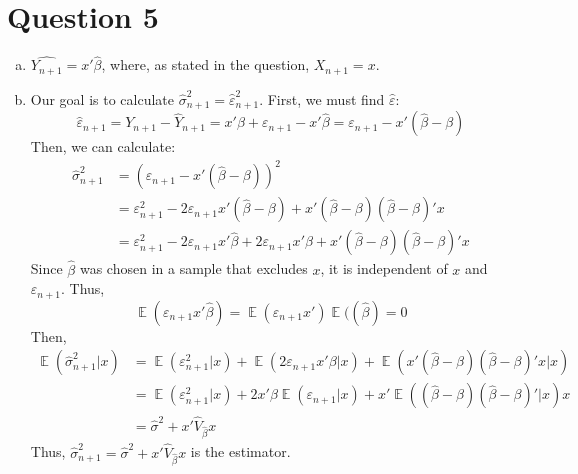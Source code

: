\documentclass{article}
\newcommand{\bhat}{\hat{\beta}}
\newcommand{\vhat}{\hat{\varepsilon}}
\DeclareMathOperator{\E}{\mathbb{E}}%
\begin{document}
\section*{Question 5}
\begin{enumerate}[(a)]
			\item ${\hat{Y_{n+1}}=x'\bhat}$, where, as stated in the question, ${X_{n+1}=x}$.
			
			\item Our goal is to calculate ${\hat{\sigma}^2_{n+1}=\vhat_{n+1}^2}$. First, we must find $\vhat$:
				\[
					\vhat_{n+1}=Y_{n+1} - \hat{Y}_{n+1} = x'\beta + \varepsilon_{n+1} - x'\bhat = \varepsilon_{n+1} - x'(\bhat-\beta)
				\]
				Then, we can calculate:
				\begin{align*}
					\hat{\sigma}^2_{n+1} 	&= \left(\varepsilon_{n+1} - x'(\bhat-\beta)\right)^2	\\
											&= \varepsilon_{n+1}^2 - 2\varepsilon_{n+1}x'(\bhat-\beta) + x'(\bhat-\beta)(\bhat-\beta)'x	\\
											&= \varepsilon_{n+1}^2 - 2\varepsilon_{n+1}x'\bhat + 2\varepsilon_{n+1}x'\beta + x'(\bhat-\beta)(\bhat-\beta)'x
				\end{align*}
				Since $\bhat$ was chosen in a sample that excludes $x$, it is independent of $x$ and $\varepsilon_{n+1}$. Thus,
				\[
					\E(\varepsilon_{n+1}x'\bhat) = \E(\varepsilon_{n+1}x')\E((\bhat) = 0
				\]
				Then, 
				\begin{align*}
					\E(\hat{\sigma}^2_{n+1}|x)	&= \E(\varepsilon_{n+1}^2|x) + \E(2\varepsilon_{n+1}x'\beta|x) + \E(x'(\bhat-\beta)(\bhat-\beta)'x|x)	\\
												&= \E(\varepsilon_{n+1}^2|x) + 2x'\beta\E(\varepsilon_{n+1}|x) + x'\E((\bhat-\beta)(\bhat-\beta)'|x)x	\\
												&= \hat{\sigma}^2 + x'\hat{V}_{\hat{\beta}}x		
				\end{align*}
				Thus, ${\hat{\sigma}^2_{n+1}=\hat{\sigma}^2 + x'\hat{V}_{\hat{\beta}}x}$ is the estimator.
			
\end{enumerate}

\end{document}
